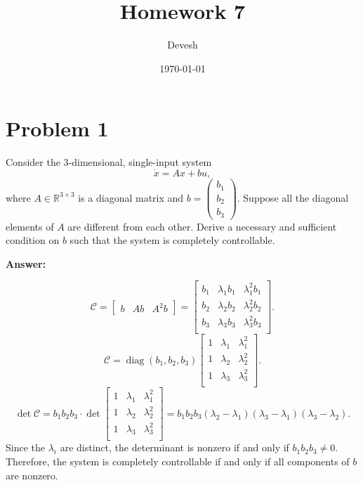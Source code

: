 \documentclass[12pt]{article}
\title{Homework 7}
\author{Devesh}
\date{\today}
\begin{document}
\maketitle

\section*{Problem 1}
Consider the 3-dimensional, single-input system
\[
\dot{x} = Ax + bu,
\]
where \( A \in \mathbb{R}^{3 \times 3} \) is a diagonal matrix and \( b = \begin{pmatrix} b_1 \\ b_2 \\ b_3 \end{pmatrix} \). Suppose all the diagonal elements of \( A \) are different from each other. Derive a necessary and sufficient condition on \( b \) such that the system is completely controllable.

\textbf{Answer:}

\[
\mathcal{C} = \begin{bmatrix} b & Ab & A^2 b \end{bmatrix} = \begin{bmatrix}
b_1 & \lambda_1 b_1 & \lambda_1^2 b_1 \\
b_2 & \lambda_2 b_2 & \lambda_2^2 b_2 \\
b_3 & \lambda_3 b_3 & \lambda_3^2 b_3 \\
\end{bmatrix}.
\]
\[
\mathcal{C} = \operatorname{diag}(b_1, b_2, b_3) \begin{bmatrix}
1 & \lambda_1 & \lambda_1^2 \\
1 & \lambda_2 & \lambda_2^2 \\
1 & \lambda_3 & \lambda_3^2 \\
\end{bmatrix}.
\]
\[
\det \mathcal{C} = b_1 b_2 b_3 \cdot \det \begin{bmatrix}
1 & \lambda_1 & \lambda_1^2 \\
1 & \lambda_2 & \lambda_2^2 \\
1 & \lambda_3 & \lambda_3^2 \\
\end{bmatrix} = b_1 b_2 b_3 (\lambda_2 - \lambda_1)(\lambda_3 - \lambda_1)(\lambda_3 - \lambda_2).
\]
Since the \( \lambda_i \) are distinct, the determinant is nonzero if and only if \( b_1 b_2 b_3 \ne 0 \). Therefore, the system is completely controllable if and only if all components of \( b \) are nonzero.
\end{document}
